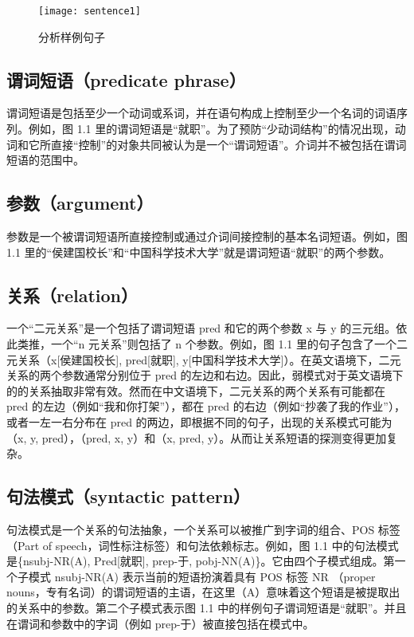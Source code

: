 \begin{figure}[ht]
\centering
\texttt{[image: sentence1]}
\caption{分析样例句子}\label{fig:sentence1}
\end{figure}

\subsection{谓词短语（predicate phrase）}
谓词短语是包括至少一个动词或系词，并在语句构成上控制至少一个名词的词语序列。例如，图 1.1 里的谓词短语是“就职”。为了预防“少动词结构”的情况出现，动词和它所直接“控制”的对象共同被认为是一个“谓词短语”。介词并不被包括在谓词短语的范围中。

\subsection{参数（argument）}
参数是一个被谓词短语所直接控制或通过介词间接控制的基本名词短语。例如，图 1.1 里的“侯建国校长”和“中国科学技术大学”就是谓词短语“就职”的两个参数。

\subsection{关系（relation）}
一个“二元关系”是一个包括了谓词短语 pred 和它的两个参数 x 与 y 的三元组。依此类推，一个“n 元关系”则包括了 n 个参数。例如，图 1.1 里的句子包含了一个二元关系（x[侯建国校长], pred[就职], y[中国科学技术大学]）。在英文语境下，二元关系的两个参数通常分别位于 pred 的左边和右边。因此，弱模式对于英文语境下的的关系抽取非常有效。然而在中文语境下，二元关系的两个关系有可能都在 pred 的左边（例如“我和你打架”），都在 pred 的右边（例如“抄袭了我的作业”），或者一左一右分布在 pred 的两边，即根据不同的句子，出现的关系模式可能为（x, y, pred），（pred, x, y）和（x, pred, y）。从而让关系短语的探测变得更加复杂。

\subsection{句法模式（syntactic pattern）}
句法模式是一个关系的句法抽象，一个关系可以被推广到字词的组合、POS 标签（Part of speech，词性标注标签）和句法依赖标志。例如，图 1.1 中的句法模式是\{nsubj-NR(A), Pred[就职], prep-于, pobj-NN(A)\}。它由四个子模式组成。第一个子模式 nsubj-NR(A) 表示当前的短语扮演着具有 POS 标签 NR （proper nouns，专有名词）的谓词短语的主语，在这里（A）意味着这个短语是被提取出的关系中的参数。第二个子模式表示图 1.1 中的样例句子谓词短语是“就职”。并且在谓词和参数中的字词（例如 prep-于）被直接包括在模式中。

